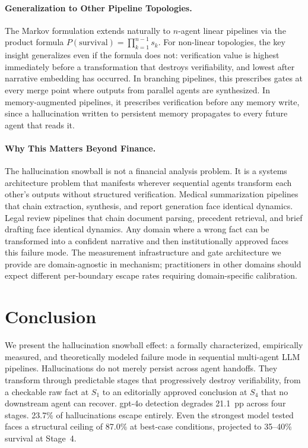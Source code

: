 \documentclass{article}
\theoremstyle{plain}
\theoremstyle{definition}
\theoremstyle{remark}
\begin{document}
\paragraph{Generalization to Other Pipeline Topologies.} The Markov formulation extends naturally to $n$-agent linear pipelines via the product formula $P(\text{survival}) = \prod_{k=1}^{n-1} s_k$. For non-linear topologies, the key insight generalizes even if the formula does not: verification value is highest immediately before a transformation that destroys verifiability, and lowest after narrative embedding has occurred. In branching pipelines, this prescribes gates at every merge point where outputs from parallel agents are synthesized. In memory-augmented pipelines, it prescribes verification before any memory write, since a hallucination written to persistent memory propagates to every future agent that reads it.

\paragraph{Why This Matters Beyond Finance.} The hallucination snowball is not a financial analysis problem. It is a systems architecture problem that manifests wherever sequential agents transform each other's outputs without structured verification. Medical summarization pipelines that chain extraction, synthesis, and report generation face identical dynamics. Legal review pipelines that chain document parsing, precedent retrieval, and brief drafting face identical dynamics. Any domain where a wrong fact can be transformed into a confident narrative and then institutionally approved faces this failure mode. The measurement infrastructure and gate architecture we provide are domain-agnostic in mechanism; practitioners in other domains should expect different per-boundary escape rates requiring domain-specific calibration.

\section{Conclusion}

We present the hallucination snowball effect: a formally characterized, empirically measured, and theoretically modeled failure mode in sequential multi-agent LLM pipelines. Hallucinations do not merely persist across agent handoffs. They transform through predictable stages that progressively destroy verifiability, from a checkable raw fact at $S_1$ to an editorially approved conclusion at $S_4$ that no downstream agent can recover. gpt-4o detection degrades 21.1~pp across four stages. 23.7\% of hallucinations escape entirely. Even the strongest model tested faces a structural ceiling of 87.0\% at best-case conditions, projected to 35--40\% survival at Stage~4.
\end{document}
